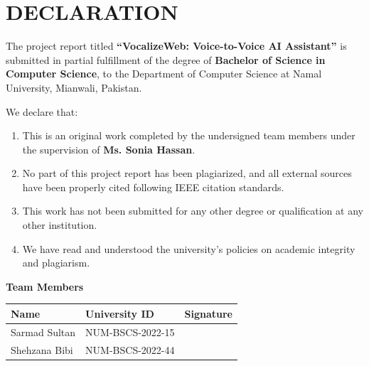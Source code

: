 \chapter*{DECLARATION}

\vspace{-0.5cm}

\begin{tcolorbox}[
    colback=white,
    colframe=primaryblue,
    arc=0pt,
    boxrule=1pt,
    left=12pt,
    right=12pt,
    top=10pt,
    bottom=10pt
]

The project report titled \textbf{``VocalizeWeb: Voice-to-Voice AI Assistant''} is submitted in partial fulfillment of the degree of \textbf{Bachelor of Science in Computer Science}, to the Department of Computer Science at Namal University, Mianwali, Pakistan.

\vspace{0.3cm}

We declare that:
\begin{enumerate}[leftmargin=*, itemsep=2pt, parsep=0pt]
    \item This is an original work completed by the undersigned team members under the supervision of \textbf{Ms. Sonia Hassan}.
    \item No part of this project report has been plagiarized, and all external sources have been properly cited following IEEE citation standards.
    \item This work has not been submitted for any other degree or qualification at any other institution.
    \item We have read and understood the university's policies on academic integrity and plagiarism.
\end{enumerate}

\end{tcolorbox}

\vspace{0.5cm}

\noindent\textbf{\textcolor{primaryblue}{Team Members}}

\vspace{0.3cm}

\begin{table}[H]
\centering
\begin{tabular}{@{}p{5cm}p{4.5cm}p{4cm}@{}}
\textbf{Name} & \textbf{University ID} & \textbf{Signature} \\[0.2cm]
\midrule
Sarmad Sultan & NUM-BSCS-2022-15 & \hrulefill \\[0.4cm]
Shehzana Bibi & NUM-BSCS-2022-44 & \hrulefill \\
\end{tabular}
\end{table}

